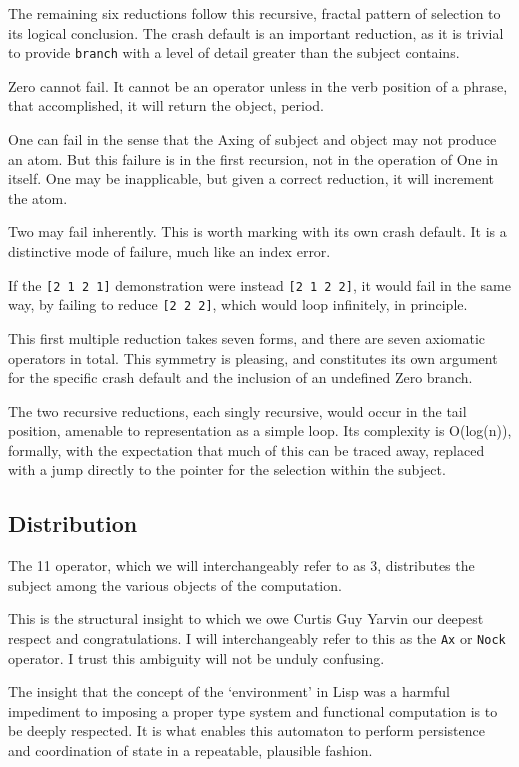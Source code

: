 \documentclass[twoside]{article}
\begin{document}
The remaining six reductions follow this recursive, fractal pattern of selection to its logical conclusion. The crash default is an important reduction, as it is trivial to provide \texttt{branch} with a level of detail greater than the subject contains.

Zero cannot fail. It cannot be an operator unless in the verb position of a phrase, that accomplished, it will return the object, period.

One can fail in the sense that the Axing of subject and object may not produce an atom. But this failure is in the first recursion, not in the operation of One in itself. One may be inapplicable, but given a correct reduction, it will increment the atom.

Two may fail inherently. This is worth marking with its own crash default. It is a distinctive mode of failure, much like an index error.

If the \lstinline[style=inlinecode]{[2 1 2 1]} demonstration were instead \lstinline[style=inlinecode]{[2 1 2 2]}, it would fail in the same way, by failing to reduce \lstinline[style=inlinecode]{[2 2 2]}, which would loop infinitely, in principle.

This first multiple reduction takes seven forms, and there are seven axiomatic operators in total. This symmetry is pleasing, and constitutes its own argument for the specific crash default and the inclusion of an undefined Zero branch.

The two recursive reductions, each singly recursive, would occur in the tail position, amenable to representation as a simple loop. Its complexity is O(log(n)), formally, with the expectation that much of this can be traced away, replaced with a jump directly to the pointer for the selection within the subject.

\subsection{Distribution}

The 11 operator, which we will interchangeably refer to as 3, distributes the subject among the various objects of the computation.

This is the structural insight to which we owe Curtis Guy Yarvin our deepest respect and congratulations. I will interchangeably refer to this as the \texttt{Ax} or \texttt{Nock} operator. I trust this ambiguity will not be unduly confusing.

The insight that the concept of the `environment' in Lisp was a harmful impediment to imposing a proper type system and functional computation is to be deeply respected. It is what enables this automaton to perform persistence and coordination of state in a repeatable, plausible fashion.
\end{document}
